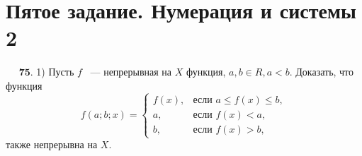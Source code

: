\documentclass[a4paper,12pt]{article} %
\begin{document}
	\section{Пятое задание. Нумерация и системы 2}
	$\quad$
	$\textbf{75.}$ 1) Пусть $f$ ~--- непрерывная на $X$ функция, $a, b \in R, a < b.$ Доказать, что функция
	\[
		f(a;b;x)=\begin{cases}
			f \left(x \right), &\text{если } a \leqslant f \left(x \right) \leqslant b, \\
		a, &\text{если } f \left(x \right) < a, \\
		b, &\text{если } f \left(x \right) > b,
		\end{cases}
	\]
	также непрерывна на $X.$

\end{document}
